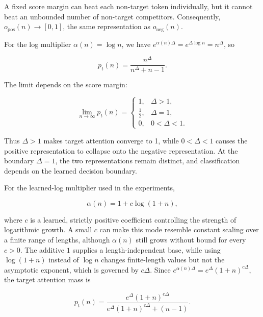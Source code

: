 \documentclass{article}
\begin{document}
A fixed score margin can beat each non-target token individually, but it cannot
beat an unbounded number of non-target competitors. Consequently,
$o_{\text{pos}}(n)\to[0,1]$, the same representation as
$o_{\text{neg}}(n)$.

For the log multiplier $\alpha(n)=\log n$, we have
$e^{\alpha(n)\Delta}=e^{\Delta\log n}=n^\Delta$, so

\begin{equation}
  p_t(n)
  =
  \frac{n^\Delta}{n^\Delta+n-1}.
  \label{eq:log-attention}
\end{equation}

The limit depends on the score margin:

\begin{equation}
  \lim_{n\to\infty}p_t(n)
  =
  \begin{cases}
    1, & \Delta>1,\\
    \tfrac12, & \Delta=1,\\
    0, & 0<\Delta<1.
  \end{cases}
  \label{eq:log-limit}
\end{equation}

Thus $\Delta>1$ makes target attention converge to 1, while $0<\Delta<1$
causes the positive representation to collapse onto the negative
representation. At the boundary $\Delta=1$, the two representations remain
distinct, and classification depends on the learned decision boundary.

For the learned-log multiplier used in the experiments,

\begin{equation}
  \alpha(n)=1+c\log(1+n),
  \label{eq:learned-log-multiplier}
\end{equation}

where $c$ is a learned, strictly positive coefficient controlling the strength
of logarithmic growth. A small $c$ can make this mode resemble constant scaling
over a finite range of lengths, although $\alpha(n)$ still grows without bound
for every $c>0$. The additive $1$ supplies a length-independent base, while
using $\log(1+n)$ instead of $\log n$ changes finite-length values but not the
asymptotic exponent, which is governed by $c\Delta$. Since
$e^{\alpha(n)\Delta}=e^\Delta(1+n)^{c\Delta}$, the target attention mass is

\begin{equation}
  p_t(n)
  =
  \frac{e^\Delta(1+n)^{c\Delta}}
       {e^\Delta(1+n)^{c\Delta}+(n-1)}.
  \label{eq:learned-log-attention}
\end{equation}
\end{document}
